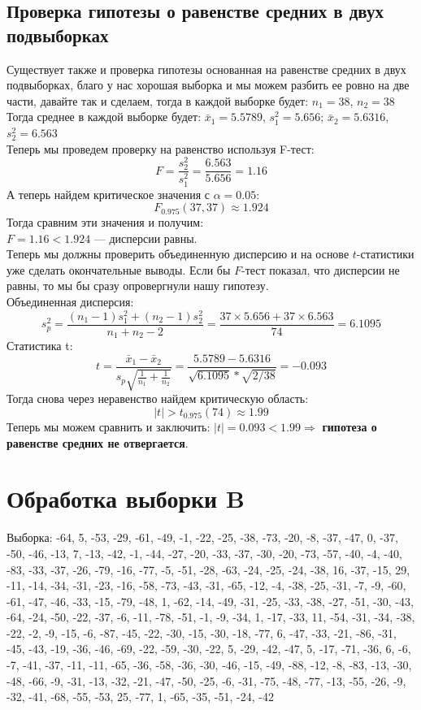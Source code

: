 \documentclass[12pt]{article}
\begin{document}
\subsection{Проверка гипотезы о равенстве средних в двух подвыборках}
Существует также и проверка гипотезы основанная на равенстве средних в двух подвыборках, 
благо у нас хорошая выборка и мы можем разбить ее ровно на две части, давайте так и сделаем, тогда в каждой выборке будет:
$n_1 = 38$, $n_2 = 38$ \\
Тогда среднее в каждой выборке будет:
$\bar{x}_1 = 5.5789$, $s_1^2 = 5.656$; $\bar{x}_2 = 5.6316$, $s_2^2 = 6.563$\\
Теперь мы проведем проверку на равенство используя F-тест:
\[
F = \frac{s_2^2}{s_1^2} = \frac{6.563}{5.656} = 1.16
\]
А теперь найдем критическое значения с $\alpha=0.05$:
\[
F_{0.975}(37,37) \approx 1.924
\]
Тогда сравним эти значения и получим:\\
$F = 1.16 < 1.924$ — дисперсии равны. \\
Теперь мы должны проверить объединенную дисперсию и на основе $t$-статистики уже сделать окончательные выводы.
Если бы $F$-тест показал, что дисперсии не равны, то мы бы сразу опровергнули нашу гипотезу.\\
Объединенная дисперсия:
\[
s_p^2 = \frac{(n_1-1)s_1^2 + (n_2-1)s_2^2}{n_1 + n_2 - 2} = \frac{37 \times 5.656 + 37 \times 6.563}{74} = 6.1095
\]
Статистика t:
\[
t = \frac{\bar{x}_1 - \bar{x}_2}{s_p \sqrt{\frac{1}{n_1} + \frac{1}{n_2}}} = \frac{5.5789 - 5.6316}{\sqrt{6.1095} * \sqrt{2/38}} = -0.093
\]
Тогда снова через неравенство найдем критическую область:
$$|t| > t_{0.975}(74) \approx 1.99$$
Теперь мы можем сравнить и заключить: $|t| = 0.093 < 1.99 \Rightarrow$ \textbf{гипотеза о равенстве средних не отвергается}.

\section{Обработка выборки B}

Выборка: -64, 5, -53, -29, -61, -49, -1, -22, -25, -38, -73, -20, -8, -37, -47, 0, -37, -50, -46, -13,
7, -13, -42, -1, -44, -27, -20, -33, -37, -30, -20, -73, -57, -40, -4, -40, -83, -33, -37, -26, -79, -16,
-77, -5, -51, -28, -63, -24, -25, -24, -38, 16, -37, -15, 29, -11, -14, -34, -31, -23, -16, -58, -73, -43,
-31, -65, -12, -4, -38, -25, -31, -7, -9, -60, -61, -47, -46, -33, -15, -79, -48, 1, -62, -14, -49, -31,
-25, -33, -38, -27, -51, -30, -43, -64, -24, -50, -22, -37, -6, -11, -78, -51, -1, -9, -34, 1, -17, -33,
11, -54, -31, -34, -38, -22, -2, -9, -15, -6, -87, -45, -22, -30, -15, -30, -18, -77, 6, -47, -33, -21,
-86, -31, -45, -43, -19, -36, -46, -69, -22, -59, -30, -22, 5, -29, -42, -47, 5, -17, -71, -36, 6, -6, -7,
-41, -37, -11, -11, -65, -36, -58, -36, -30, -46, -15, -49, -88, -12, -8, -83, -13, -30, -48, -66, -9, -31,
-13, -32, -21, -47, -50, -25, -6, -31, -75, -48, -77, -13, -55, -26, -9, -32, -41, -68, -55, -53, 25, -77,
1, -65, -35, -51, -24, -42
\end{document}
